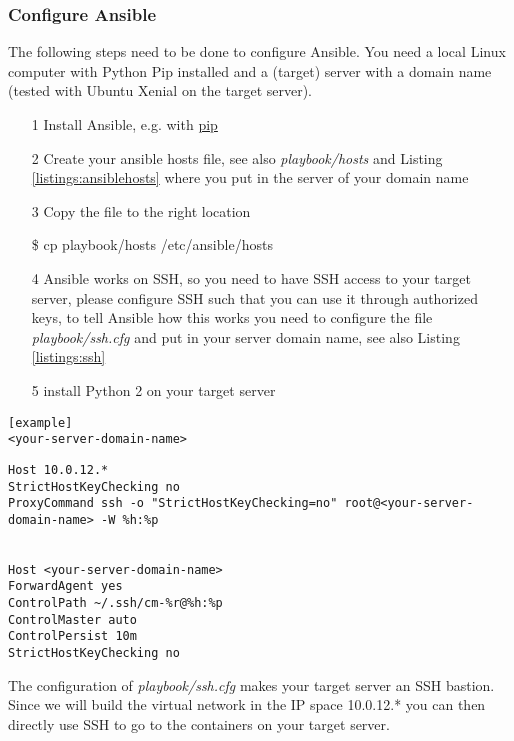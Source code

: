 \subsubsection{Configure Ansible}
The following steps need to be done to configure Ansible. You need a local Linux computer with Python Pip installed and a (target) server with a domain name (tested with Ubuntu Xenial on the target server). 
\begin{itemize}
	\item[1] Install Ansible, e.g. with \href{http://docs.ansible.com/ansible/intro_installation.html#latest-releases-via-pip}{pip}
	\item[2] Create your ansible hosts file, see also \textit{playbook/hosts} and Listing \ref{listings:ansiblehosts} where you put in the server of your domain name
	\item[3] Copy the file to the right location
	\begin{tcolorbox}
		\$	cp playbook/hosts /etc/ansible/hosts
	\end{tcolorbox}
	\item[4] Ansible works on SSH, so you need to have SSH access to your target server, please configure SSH such that you can use it through authorized keys, to tell Ansible how this works you need to configure the file \textit{playbook/ssh.cfg} and put in your server domain name, see also Listing \ref{listings:ssh}
	\item[5] install Python 2 on your target server
\end{itemize}
\begin{lstlisting}[caption={Example of Ansible hosts file},label={listings:ansiblehosts}]
[example]
<your-server-domain-name>
\end{lstlisting}
\begin{lstlisting}[caption={Example of Ansible ssh.cfg file},label={listings:ssh}]
Host 10.0.12.*
StrictHostKeyChecking no
ProxyCommand ssh -o "StrictHostKeyChecking=no" root@<your-server-domain-name> -W %h:%p


Host <your-server-domain-name>
ForwardAgent yes
ControlPath ~/.ssh/cm-%r@%h:%p
ControlMaster auto
ControlPersist 10m
StrictHostKeyChecking no

\end{lstlisting}
The configuration of \textit{playbook/ssh.cfg} makes your target server an SSH bastion. Since we will build the virtual network in the IP space 10.0.12.* you can then directly use SSH to go to the containers on your target server. 


